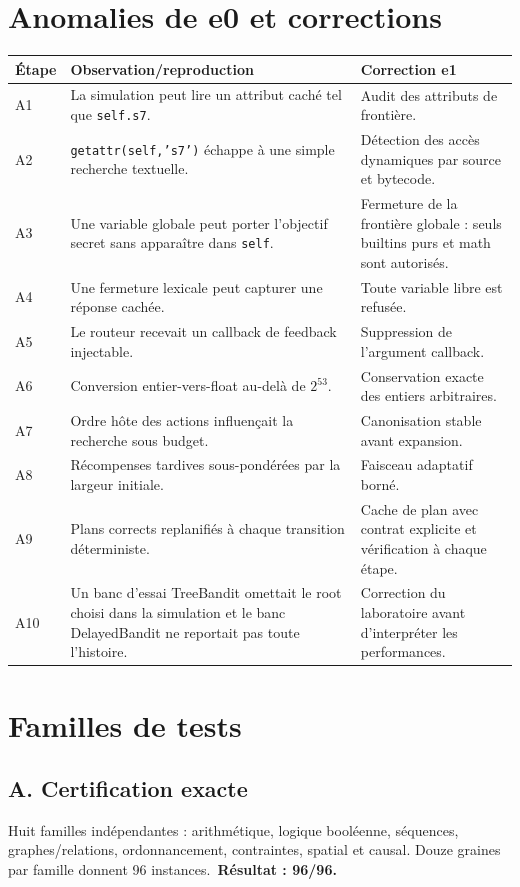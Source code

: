 \documentclass[11pt,a4paper]{article}
\begin{document}
\section{Anomalies de e0 et corrections}
\begin{longtable}{p{}p{}p{}}
\toprule
Étape & Observation/reproduction & Correction e1 \\
\midrule
A1 & La simulation peut lire un attribut caché tel que \texttt{self.s7}. & Audit des attributs de frontière. \\
A2 & \texttt{getattr(self,'s7')} échappe à une simple recherche textuelle. & Détection des accès dynamiques par source et bytecode. \\
A3 & Une variable globale peut porter l'objectif secret sans apparaître dans \texttt{self}. & Fermeture de la frontière globale : seuls builtins purs et math sont autorisés. \\
A4 & Une fermeture lexicale peut capturer une réponse cachée. & Toute variable libre est refusée. \\
A5 & Le routeur recevait un callback de feedback injectable. & Suppression de l'argument callback. \\
A6 & Conversion entier-vers-float au-delà de $2^{53}$. & Conservation exacte des entiers arbitraires. \\
A7 & Ordre hôte des actions influençait la recherche sous budget. & Canonisation stable avant expansion. \\
A8 & Récompenses tardives sous-pondérées par la largeur initiale. & Faisceau adaptatif borné. \\
A9 & Plans corrects replanifiés à chaque transition déterministe. & Cache de plan avec contrat explicite et vérification à chaque étape. \\
A10 & Un banc d'essai TreeBandit omettait le root choisi dans la simulation et le banc DelayedBandit ne reportait pas toute l'histoire. & Correction du laboratoire avant d'interpréter les performances. \\
\bottomrule
\end{longtable}
\section{Familles de tests}
\subsection{A. Certification exacte}
Huit familles indépendantes : arithmétique, logique booléenne, séquences, graphes/relations, ordonnancement, contraintes, spatial et causal. Douze graines par famille donnent 96 instances.\
\textbf{Résultat : 96/96.}
\end{document}
